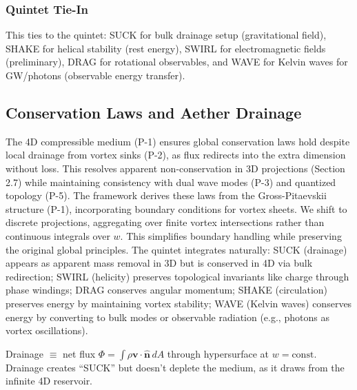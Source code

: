 \subsubsection{Quintet Tie-In}

This ties to the quintet: SUCK for bulk drainage setup (gravitational field), SHAKE for helical stability (rest energy), SWIRL for electromagnetic fields (preliminary), DRAG for rotational observables, and WAVE for Kelvin waves for GW/photons (observable energy transfer).


\subsection{Conservation Laws and Aether Drainage}

The 4D compressible medium (P-1) ensures global conservation laws hold despite local drainage from vortex sinks (P-2), as flux redirects into the extra dimension without loss. This resolves apparent non-conservation in 3D projections (Section 2.7) while maintaining consistency with dual wave modes (P-3) and quantized topology (P-5). The framework derives these laws from the Gross-Pitaevskii structure (P-1), incorporating boundary conditions for vortex sheets. We shift to discrete projections, aggregating over finite vortex intersections rather than continuous integrals over $w$. This simplifies boundary handling while preserving the original global principles. The quintet integrates naturally: SUCK (drainage) appears as apparent mass removal in 3D but is conserved in 4D via bulk redirection; SWIRL (helicity) preserves topological invariants like charge through phase windings; DRAG conserves angular momentum; SHAKE (circulation) preserves energy by maintaining vortex stability; WAVE (Kelvin waves) conserves energy by converting to bulk modes or observable radiation (e.g., photons as vortex oscillations).

Drainage $\equiv$ net flux $\Phi = \int \rho \mathbf{v} \cdot \hat{\mathbf{n}} \, dA$ through hypersurface at $w = \text{const}$. Drainage creates ``SUCK'' but doesn't deplete the medium, as it draws from the infinite 4D reservoir.

